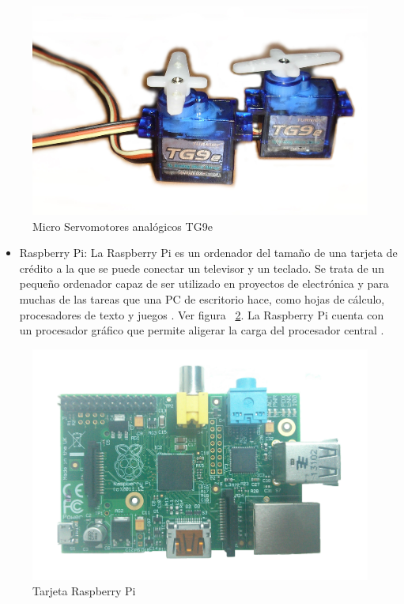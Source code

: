 \begin{figure}[hbtp]
\centering
\includegraphics[scale=0.09]{imagenes/servosTg9B.jpg}

\caption{Micro Servomotores analógicos TG9e}

\label{fig:Servo}
\end{figure}

\begin{itemize}
\item Raspberry Pi: La Raspberry Pi es un ordenador del tamaño de una tarjeta de crédito a la que se puede conectar un televisor y un teclado. Se trata de un pequeño ordenador capaz de ser utilizado en proyectos de electrónica y para muchas de las tareas que una PC de escritorio hace, como hojas de cálculo, procesadores de texto y juegos \cite{raspberry}. Ver figura ~\ref{fig:Raspe}. La Raspberry Pi cuenta con un procesador gráfico que permite aligerar la carga del procesador central \cite{elLinux}. 

\end{itemize}

\begin{figure}[hbtp]
\centering
\includegraphics[scale=0.06]{imagenes/RaspberryPi.jpg}
\caption{Tarjeta Raspberry Pi}
\label{fig:Raspe}
\end{figure}

